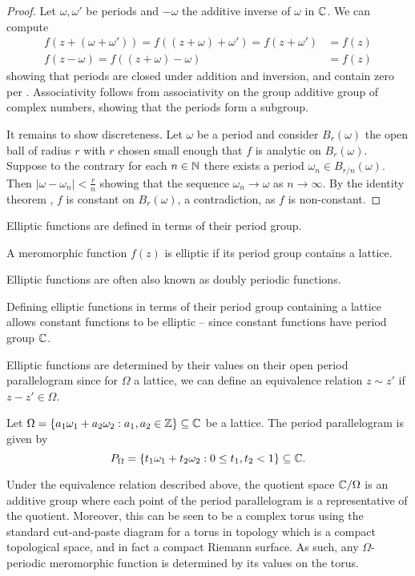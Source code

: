 \begin{proof}
    Let $\omega,\omega'$ be periods and $-\omega$ the additive inverse of $\omega$ in $\mathbb{C}$. We can compute  
    \begin{align*}
        f(z+(\omega+\omega'))=f((z+\omega)+\omega')=f(z+\omega')&=f(z) \\
        f(z-\omega)=f((z+\omega)-\omega)&=f(z)
    \end{align*}
    showing that periods are closed under addition and inversion, and contain zero per . Associativity follows from associativity on the group additive group of complex numbers, showing that the periods form a subgroup. 

    It remains to show discreteness. Let $\omega$ be a period and consider $B_{r}(\omega)$ the open ball of radius $r$ with $r$ chosen small enough that $f$ is analytic on $B_{r}(\omega)$. Suppose to the contrary for each $n\in\mathbb{N}$ there exists a period $\omega_{n}\in B_{r/n}(\omega)$. Then $|\omega-\omega_{n}|<\frac{r}{n}$ showing that the sequence $\omega_{n}\to\omega$ as $n\to\infty$. By the identity theorem , $f$ is constant on $B_{r}(\omega)$, a contradiction, as $f$ is non-constant. 
\end{proof}
Elliptic functions are defined in terms of their period group. 
\begin{definition}\label{def: elliptic function}
    A meromorphic function $f(z)$ is elliptic if its period group contains a lattice. 
\end{definition}
\begin{remark}
    Elliptic functions are often also known as doubly periodic functions. 
\end{remark}
\begin{remark}
    Defining elliptic functions in terms of their period group containing a lattice allows constant functions to be elliptic -- since constant functions have period group $\mathbb{C}$. 
\end{remark}
Elliptic functions are determined by their values on their open period parallelogram since for $\Omega$ a lattice, we can define an equivalence relation $z\sim z'$ if $z-z'\in\Omega$.
\begin{definition}\label{def: period parallelogram}
    Let $\Omega=\{a_{1}\omega_{1}+a_{2}\omega_{2}:a_{1},a_{2}\in\mathbb{Z}\}\subseteq\mathbb{C}$ be a lattice. The period parallelogram is given by 
    $$P_{\Omega}=\{t_{1}\omega_{1}+t_{2}\omega_{2}:0\leq t_{1},t_{2}<1\}\subseteq\mathbb{C}.$$ 
\end{definition}
Under the equivalence relation described above, the quotient space $\mathbb{C}/\Omega$ is an additive group where each point of the period parallelogram is a representative of the quotient. Moreover, this can be seen to be a complex torus using the standard cut-and-paste diagram for a torus in topology which is a compact topological space, and in fact a compact Riemann surface. As such, any $\Omega$-periodic meromorphic function is determined by its values on the torus. 

